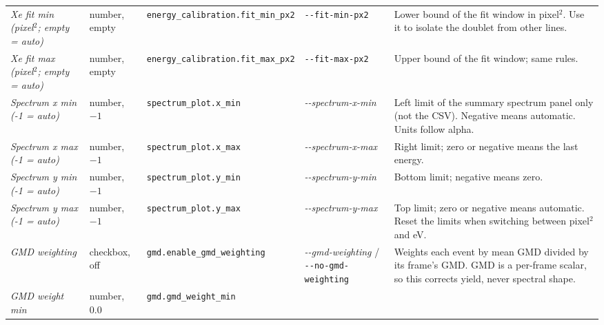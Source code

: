 \documentclass[11pt,a4paper]{article}
\newcommand{\code}[1]{\texttt{#1}}
\begin{document}
\begin{center}
\begin{longtable}{@{}L{3.4cm}L{2.3cm}L{2.5cm}L{2.8cm}L{4.9cm}@{}}
\addlinespace
\emph{Xe fit min (pixel$^2$; empty = auto)} & number, empty &
\code{energy\_\allowbreak{}calibration.fit\_\allowbreak{}min\_\allowbreak{}px2} & \code{-\allowbreak{}-\allowbreak{}fit-\allowbreak{}min-\allowbreak{}px2} & Lower bound of
the fit window in pixel$^2$. Use it to isolate the doublet from other lines. \\
\addlinespace
\emph{Xe fit max (pixel$^2$; empty = auto)} & number, empty &
\code{energy\_\allowbreak{}calibration.fit\_\allowbreak{}max\_\allowbreak{}px2} & \code{-\allowbreak{}-\allowbreak{}fit-\allowbreak{}max-\allowbreak{}px2} & Upper bound of
the fit window; same rules. \\
\addlinespace
\emph{Spectrum x min (-\allowbreak{}1 = auto)} & number, $-1$ & \code{spectrum\_\allowbreak{}plot.\allowbreak{}x\_\allowbreak{}min} &
\emph{-\allowbreak{}-\allowbreak{}spectrum-\allowbreak{}x-\allowbreak{}min} & Left limit of the summary spectrum panel only
(not the CSV). Negative means automatic. Units follow alpha. \\
\addlinespace
\emph{Spectrum x max (-\allowbreak{}1 = auto)} & number, $-1$ & \code{spectrum\_\allowbreak{}plot.\allowbreak{}x\_\allowbreak{}max} &
\emph{-\allowbreak{}-\allowbreak{}spectrum-\allowbreak{}x-\allowbreak{}max} & Right limit; zero or negative means the last
energy. \\
\addlinespace
\emph{Spectrum y min (-\allowbreak{}1 = auto)} & number, $-1$ & \code{spectrum\_\allowbreak{}plot.\allowbreak{}y\_\allowbreak{}min} &
\emph{-\allowbreak{}-\allowbreak{}spectrum-\allowbreak{}y-\allowbreak{}min} & Bottom limit; negative means zero. \\
\addlinespace
\emph{Spectrum y max (-\allowbreak{}1 = auto)} & number, $-1$ & \code{spectrum\_\allowbreak{}plot.\allowbreak{}y\_\allowbreak{}max} &
\emph{-\allowbreak{}-\allowbreak{}spectrum-\allowbreak{}y-\allowbreak{}max} & Top limit; zero or negative means automatic. Reset
the limits when switching between pixel$^2$ and eV. \\
\addlinespace
\emph{GMD weighting} & checkbox, off & \code{gmd.\allowbreak{}enable\_\allowbreak{}gmd\_\allowbreak{}weighting} &
\emph{-\allowbreak{}-\allowbreak{}gmd-\allowbreak{}weighting} / \code{-\allowbreak{}-\allowbreak{}no-\allowbreak{}gmd-\allowbreak{}weighting} & Weights each event by
mean GMD divided by its frame's GMD. GMD is a per-frame scalar, so this
corrects yield, never spectral shape. \\
\addlinespace
\emph{GMD weight min} & number, 0.0 & \code{gmd.\allowbreak{}gmd\_\allowbreak{}weight\_\allowbreak{}min} &

\end{longtable}
\end{center}
\end{document}
